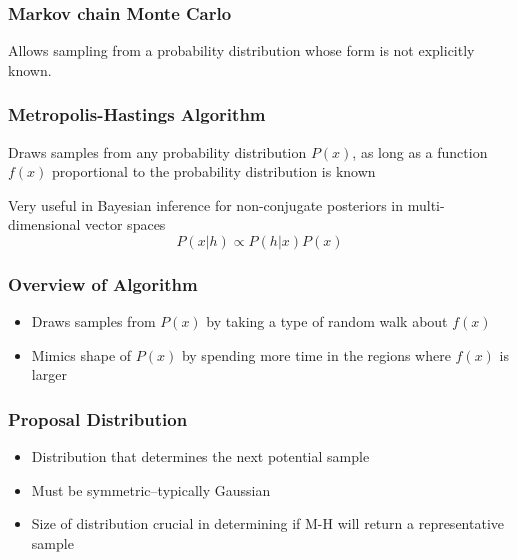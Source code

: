 \begin{frame}
  \frametitle{Markov chain Monte Carlo}
  Allows sampling from a probability distribution whose form is not explicitly
  known.
\end{frame}

\begin{frame}
  \frametitle{Metropolis-Hastings Algorithm}
  \begin{center}
    Draws samples from any probability distribution $P(x)$, as long as a
    function $f(x)$ proportional to the probability distribution is known
    \vspace{4em}

    Very useful in Bayesian inference for non-conjugate posteriors in
    multi-dimensional vector spaces
    \[P(x|h) \propto P(h|x) P(x)\]
  \end{center}
\end{frame}

\begin{frame}
  \frametitle{Overview of Algorithm}
  \begin{itemize}
  \item Draws samples from $P(x)$ by taking a type of random walk about $f(x)$
  \item Mimics shape of $P(x)$ by spending more time in the regions where $f(x)$
    is larger
  \end{itemize}
\end{frame}

\begin{frame}
  \frametitle{Proposal Distribution}
  \begin{itemize}
  \item Distribution that determines the next potential sample
  \item Must be symmetric--typically Gaussian
  \item Size of distribution crucial in determining if M-H will return a
    representative sample
  \end{itemize}
\end{frame}

\begin{frame}
  \frametitle{}
\end{frame}